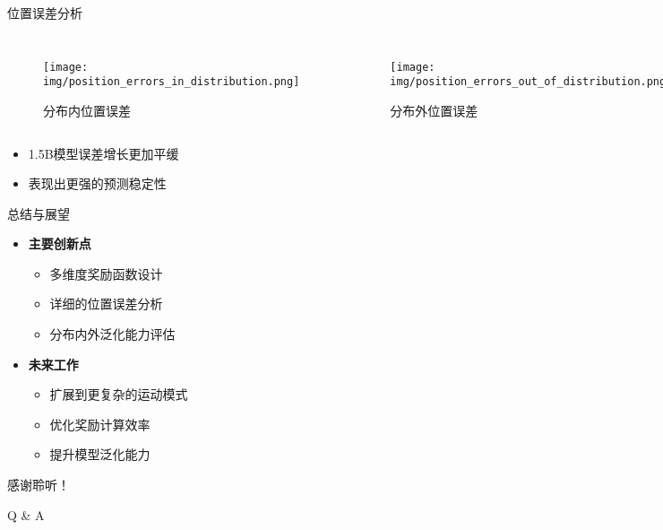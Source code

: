 \begin{frame}{位置误差分析}
    \begin{columns}
        \begin{figure}
            \texttt{[image: img/position\_errors\_in\_distribution.png]}
            \caption{分布内位置误差}
        \end{figure}
        \begin{figure}
            \texttt{[image: img/position\_errors\_out\_of\_distribution.png]}
            \caption{分布外位置误差}
        \end{figure}
    \end{columns}
    \begin{itemize}
        \item 1.5B模型误差增长更加平缓
        \item 表现出更强的预测稳定性
    \end{itemize}
\end{frame}

\begin{frame}{总结与展望}
    \begin{itemize}
        \item \textbf{主要创新点}
        \begin{itemize}
            \item 多维度奖励函数设计
            \item 详细的位置误差分析
            \item 分布内外泛化能力评估
        \end{itemize}
        \vspace{0.3cm}
        \item \textbf{未来工作}
        \begin{itemize}
            \item 扩展到更复杂的运动模式
            \item 优化奖励计算效率
            \item 提升模型泛化能力
        \end{itemize}
    \end{itemize}
\end{frame}

\begin{frame}
    \begin{center}
        \Huge 感谢聆听！
        \vspace{1cm}
        
        \Large Q \& A
    \end{center}
\end{frame}

